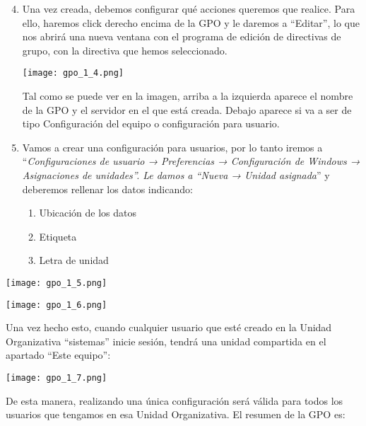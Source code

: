 \begin{enumerate}
    \setcounter{enumi}{3}
    \item Una vez creada, debemos configurar qué acciones queremos que realice. Para ello, haremos click derecho encima de la GPO y le daremos a “Editar”, lo que nos abrirá una nueva ventana con el programa de edición de directivas de grupo, con la directiva que hemos seleccionado.

    \begin{center}
        \texttt{[image: gpo\_1\_4.png]}
    \end{center}

    Tal como se puede ver en la imagen, arriba a la izquierda aparece el nombre de la GPO y el servidor en el que está creada. Debajo aparece si va a ser de tipo Configuración del equipo o configuración para usuario.

    \item Vamos a crear una configuración para usuarios, por lo tanto iremos a “\textit{Configuraciones de usuario → Preferencias → Configuración de Windows → Asignaciones de unidades”. Le damos a “Nueva → Unidad asignada}” y deberemos rellenar los datos indicando:
    \begin{enumerate}
        \item Ubicación de los datos
        \item Etiqueta
        \item Letra de unidad
    \end{enumerate}
\end{enumerate}

{
    \begin{minipage}{0.46\linewidth}
        \texttt{[image: gpo\_1\_5.png]}
    \end{minipage}
    \hfill
    \begin{minipage}{0.46\linewidth}
        \texttt{[image: gpo\_1\_6.png]}
    \end{minipage}
}

Una vez hecho esto, cuando cualquier usuario que esté creado en la Unidad Organizativa “sistemas” inicie sesión, tendrá una unidad compartida en el apartado “Este equipo”:

\begin{center}
    \texttt{[image: gpo\_1\_7.png]}
\end{center}

De esta manera, realizando una única configuración será válida para todos los usuarios que tengamos en esa Unidad Organizativa. El resumen de la GPO es:

